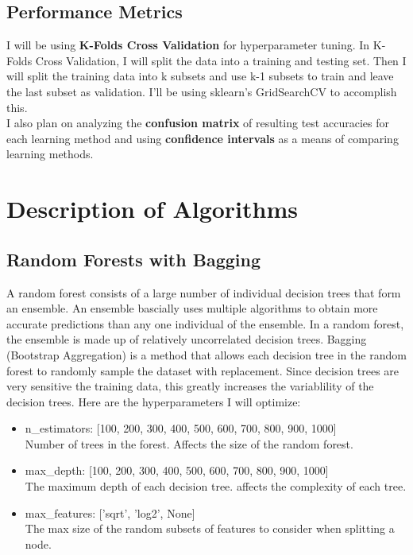 \documentclass[12pt]{article}
\begin{document}
\subsection{Performance Metrics}
I will be using \textbf{K-Folds Cross Validation} for hyperparameter tuning. In K-Folds Cross Validation, I will split the data into a training and testing set. Then I will split the training data into k subsets and use k-1 subsets to train and leave the last subset as validation. I'll be using sklearn's GridSearchCV to accomplish this. \\
I also plan on analyzing the \textbf{confusion matrix} of resulting test accuracies for each learning method and using \textbf{confidence intervals} as a means of comparing learning methods.

\section{Description of Algorithms}
\subsection{Random Forests with Bagging}
A random forest consists of a large number of individual decision trees that form an ensemble. An ensemble bascially uses multiple algorithms to obtain more accurate predictions than any one individual of the ensemble. In a random forest, the ensemble is made up of relatively uncorrelated decision trees. Bagging (Bootstrap Aggregation) is a method that allows each decision tree in the random forest to randomly sample the dataset with replacement. Since decision trees are very sensitive the training data, this greatly increases the variablility of the decision trees. Here are the hyperparameters I will optimize:
\begin{itemize}
    \item n\_estimators: [100, 200, 300, 400, 500, 600, 700, 800, 900, 1000]
    \\ Number of trees in the forest. Affects the size of the random forest.
    \item max\_depth: [100, 200, 300, 400, 500, 600, 700, 800, 900, 1000]
    \\ The maximum depth of each decision tree. affects the complexity of each tree.
    \item max\_features: ['sqrt', 'log2', None]
    \\ The max size of the random subsets of features to consider when splitting a node.
\end{itemize}
\end{document}
